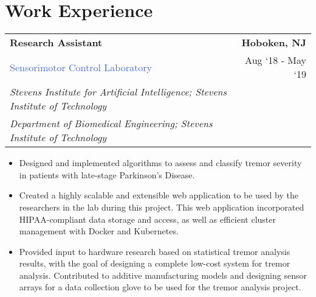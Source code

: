 \documentclass[10pt]{article}
\newcommand{\highlightcolor}{RoyalBlue}
\newcommand{\tabularxwidth}{\textwidth}
\begin{document}
    
        \section{Work Experience}

    
    \begin{minipage}{\tabularxwidth}

        \begin{tabularx}{\tabularxwidth}{X r}
            \textbf{Research Assistant} & \textbf{Hoboken, 
        NJ} \\
            \textcolor{\highlightcolor}{Sensorimotor Control Laboratory} & 
        
    Aug ‘18 - 
    May ‘19 \\
            
                
                    \textit{Stevens Institute for Artificial Intelligence; Stevens Institute of Technology} & \\
                
                    \textit{Department of Biomedical Engineering; Stevens Institute of Technology} & \\
                
            
            
        \end{tabularx}

        \begin{itemize}[noitemsep, topsep=3pt, parsep=0pt, partopsep=0pt]
            
                \item 
    Designed and implemented algorithms to assess and classify tremor severity in patients with late-stage Parkinson's Disease.
            
                \item 
    Created a highly scalable and extensible web application to be used by the researchers in the lab during this project. This web application incorporated HIPAA-compliant data storage and access, as well as efficient cluster management with Docker and Kubernetes.
            
                \item 
    Provided input to hardware research based on statistical tremor analysis results, with the goal of designing a complete low-cost system for tremor analysis. Contributed to additive manufacturing models and designing sensor arrays for a data collection glove to be used for the tremor analysis project.
            

\end{itemize}
\end{minipage}
\end{document}
